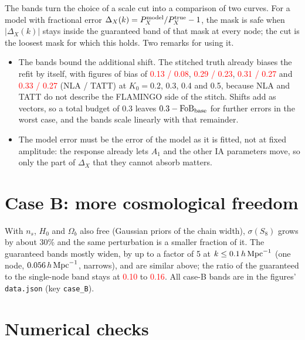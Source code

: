 \documentclass[11pt]{article}
\newcommand{\hMpc}{\,h\,{\rm Mpc}^{-1}}
\newcommand{\FoB}{{\rm FoB}}
\newif\ifnumbersfinal
\newcommand{\refresh}[1]{\ifnumbersfinal#1\else\textcolor{red}{#1}\fi}
\newcommand{\RatioLo}{\refresh{0.10}}
\newcommand{\RatioHi}{\refresh{0.16}}
\newcommand{\BaseTwo}{\refresh{0.13 / 0.08}}
\newcommand{\BaseThree}{\refresh{0.29 / 0.23}}
\newcommand{\BaseFour}{\refresh{0.31 / 0.27}}
\newcommand{\BaseFive}{\refresh{0.33 / 0.27}}
\begin{document}
The bands turn the choice of a scale cut into a comparison of two curves.
For a model with fractional error $\Delta_X(k) = P_X^{\rm model}/P_X^{\rm
true} - 1$, the mask is safe when $|\Delta_X(k)|$ stays inside the
guaranteed band of that mask at every node; the cut is the loosest mask for
which this holds. Two remarks for using it.
\begin{itemize}
  \item The bands bound the additional shift. The stitched truth already
    biases the refit by itself, with figures of bias of \BaseTwo,
    \BaseThree, \BaseFour{} and \BaseFive{} (NLA / TATT) at $K_0 = 0.2$,
    0.3, 0.4 and 0.5, because NLA and TATT do not describe the FLAMINGO
    side of the stitch. Shifts add as vectors, so a total budget of 0.3
    leaves $0.3 - \FoB_{\rm base}$ for further errors in the worst case,
    and the bands scale linearly with that remainder.
  \item The model error must be the error of the model as it is fitted,
    not at fixed amplitude: the response already lets $A_1$ and the other
    IA parameters move, so only the part of $\Delta_X$ that they cannot
    absorb matters.
\end{itemize}

\appendix

\section{Case B: more cosmological freedom}
\label{app:caseB}

With $n_s$, $H_0$ and $\Omega_b$ also free (Gaussian priors of the chain
width), $\sigma(S_8)$ grows by about 30\% and the same perturbation is a
smaller fraction of it. The guaranteed bands mostly widen, by up to a
factor of 5 at $k \le 0.1\hMpc$ (one node, $0.056\hMpc$, narrows), and are
similar above; the ratio of the guaranteed to
the single-node band stays at \RatioLo{} to \RatioHi. All case-B bands are in
the figures' \texttt{data.json} (key \texttt{case\_B}).

\section{Numerical checks}
\label{app:checks}
\end{document}
